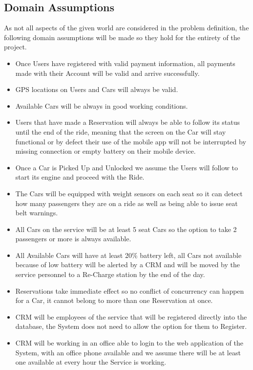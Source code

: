 \documentclass[a4paper]{article}
\begin{document}
\subsection{Domain Assumptions}
As not all aspects of the given world are considered in the problem definition, the following domain assumptions will be made so they hold for the entirety of the project.
\begin{itemize}
\item Once Users have registered with valid payment information, all payments made with their Account will be valid and arrive successfully.
\item GPS locations on Users and Cars will always be valid.
\item Available Cars will be always in good working conditions.
\item Users that have made a Reservation will always be able to follow its status until the end of the ride, meaning that the screen on the Car will stay functional or by defect their use of the mobile app will not be interrupted by missing connection or empty battery on their mobile device.
\item Once a Car is Picked Up and Unlocked we assume the Users will follow to start its engine and proceed with the Ride. 
\item The Cars will be equipped with weight sensors on each seat so it can detect how many passengers they are on a ride as well as being able to issue seat belt warnings.
\item All Cars on the service will be at least 5 seat Cars so the option to take 2 passengers or more is always available.
\item All Available Cars will have at least 20\% battery left, all Cars not available because of low battery will be alerted by a CRM and will be moved by the service personnel to a Re-Charge station by the end of the day. 
\item Reservations take immediate effect so no conflict of concurrency can happen for a Car, it cannot belong to more than one Reservation at once.
\item CRM will be employees of the service that will be registered directly into the database, the System does not need to allow the option for them to Register. 
\item CRM will be working in an office able to login to the web application of the System, with an office phone available and we assume there will be at least one available at every hour the Service is working. 
\end{itemize}
\end{document}
